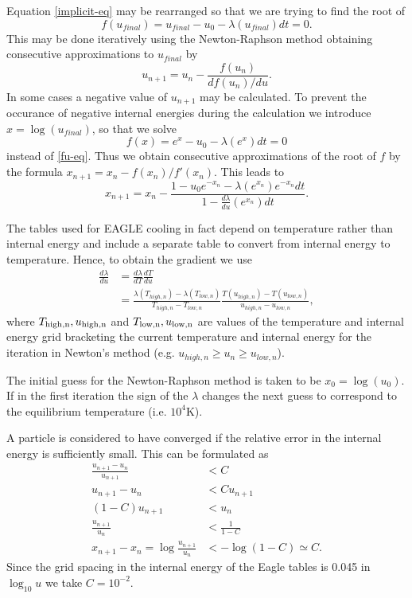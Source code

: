 \documentclass[fleqn, usenatbib, useAMS, a4paper]{mnras}
\newcommand{\D}[2]{\frac{d#1}{d#2}}
\newcommand{\LL}{\left(}
\newcommand{\RR}{\right)}
\begin{document}
Equation \ref{implicit-eq} may be rearranged so that we are trying to
find the root of 
\begin{equation}\label{fu-eq}
f(u_{final}) = u_{final} - u_0 - \lambda(u_{final}) dt = 0.
\end{equation}
This may be done iteratively using the Newton-Raphson method obtaining
consecutive approximations to $u_{final}$ by 
\begin{equation}
u_{n+1} = u_n - \frac{f(u_n)}{df(u_n)/du}.
\end{equation}
In some cases a negative value of $u_{n+1}$ may be calculated. To 
prevent the occurance of negative internal energies during the
calculation we introduce $x = \log (u_{final})$, so that we solve
\begin{equation}\label{fx-eq}
f(x) = e^x - u_0 - \lambda(e^x) dt = 0
\end{equation}
instead of \ref{fu-eq}. Thus we obtain consecutive approximations of 
the root of $f$ by the formula $x_{n+1} = x_n - f(x_n)/f'(x_n)$. This 
leads to
\begin{equation}
x_{n+1} = x_n - \frac{1 - u_0 e^{-x_n} -\lambda(e^{x_n})e^{-x_n}dt}{1
  - \frac{d\lambda}{du}(e^{x_n}) dt}.
\end{equation}

The tables used for EAGLE cooling in fact depend on temperature rather 
than internal energy and include a separate table to convert from
internal energy to temperature. Hence, to obtain the gradient we use
\begin{align*}
  \D \lambda u &= \D \lambda T \D T u \\
               &= \frac{\lambda(T_{high,n})
    - \lambda(T_{low,n})}{T_{high,n} - T_{low,n}}
                  \frac{T(u_{high,n})
    - T(u_{low,n})}{u_{high,n} - u_{low,n}},
\end{align*}
where $T_{\rm high,n}, u_{\rm high,n}$ and $T_{\rm low,n}, u_{\rm low,n}$ 
are values of the temperature and internal energy grid bracketing the current 
temperature and internal energy for the iteration in Newton's method 
(e.g. $u_{high,n} \ge u_n \ge u_{low,n}$).

The initial guess for the Newton-Raphson method is taken to be $x_0 = \log(u_0)$.
If in the first iteration the sign of the $\lambda$ changes the next
guess to correspond to the equilibrium temperature (i.e. $10^4$K). 

A particle is considered to have converged if the relative error in
the internal energy is sufficiently small. This can be formulated as
\begin{align*}
\frac{u_{n+1} - u_n}{u_{n+1}} &< C \\
u_{n+1} - u_n &< Cu_{n+1} \\
\LL 1-C\RR u_{n+1} &< u_n \\
\frac{u_{n+1}}{u_n} &< \frac{1}{1-C} \\
x_{n+1} - x_n = \log\frac{u_{n+1}}{u_n} &< -\log\LL 1-C \RR \simeq C.
\end{align*}
Since the grid spacing in the internal energy of the Eagle tables is
0.045 in $\log_{10}u$ we take $C = 10^{-2}$.
\end{document}
